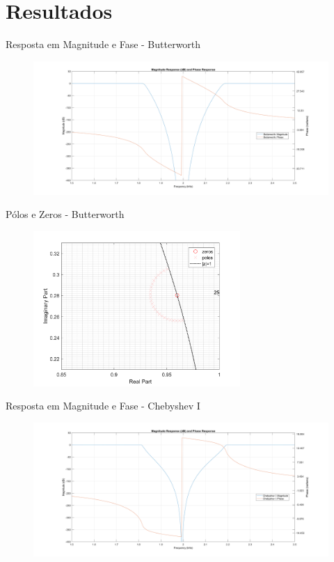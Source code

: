 \section{Resultados}
\begin{frame}{Resposta em Magnitude e Fase - Butterworth}
    \begin{figure}
        \centering
        \includegraphics[width=1.1\textwidth]{graficos/mag_pha_b.png}
    \end{figure}
\end{frame}

\begin{frame}{Pólos e Zeros - Butterworth}
    \begin{figure}
        \centering
        \includegraphics[width=0.7\textwidth]{graficos/zp_b.png}
    \end{figure}
\end{frame}

\begin{frame}{Resposta em Magnitude e Fase - Chebyshev I}
    \begin{figure}
        \centering
        \includegraphics[width=1.1\textwidth]{graficos/mag_pha_c1.png}
    \end{figure}
\end{frame}


